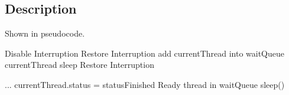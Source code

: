 \documentclass{article}
\begin{document}
\subsection{Description}
Shown in pseudocode.
\begin{algorithm}
  \begin{algorithmic}
			\State Disable Interruption
					\State Restore Interruption
					\State \Return
				\Else
					\State add currentThread into waitQueue
					\State currentThread sleep
				\EndIf
			\State Restore Interruption
		\EndProcedure
  \end{algorithmic}
	\begin{algorithmic}
			\State ...
			\State currentThread.status = statusFinished
			\State Ready thread in waitQueue
			\State sleep()
		\EndProcedure
  \end{algorithmic}
\end{algorithm}
\end{document}
